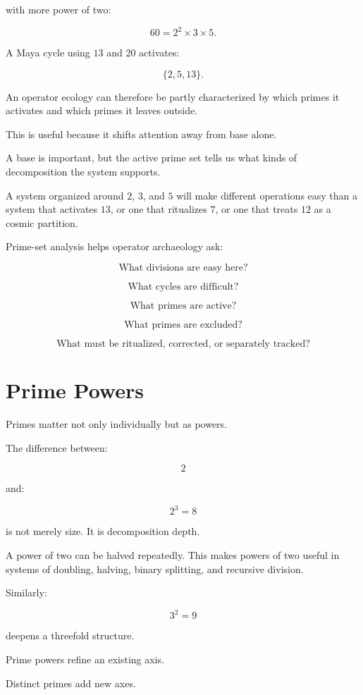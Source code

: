 \documentclass[11pt]{book}
\begin{document}
with more power of two:

\[
60 = 2^2 \times 3 \times 5.
\]

A Maya cycle using \(13\) and \(20\) activates:

\[
\{2,5,13\}.
\]

An operator ecology can therefore be partly characterized by which primes it activates and which primes it leaves outside.

This is useful because it shifts attention away from base alone.

A base is important, but the active prime set tells us what kinds of decomposition the system supports.

A system organized around \(2\), \(3\), and \(5\) will make different operations easy than a system that activates \(13\), or one that ritualizes \(7\), or one that treats \(12\) as a cosmic partition.

Prime-set analysis helps operator archaeology ask:

\[
\text{What divisions are easy here?}
\]

\[
\text{What cycles are difficult?}
\]

\[
\text{What primes are active?}
\]

\[
\text{What primes are excluded?}
\]

\[
\text{What must be ritualized, corrected, or separately tracked?}
\]

\section{Prime Powers}

Primes matter not only individually but as powers.

The difference between:

\[
2
\]

and:

\[
2^3 = 8
\]

is not merely size. It is decomposition depth.

A power of two can be halved repeatedly. This makes powers of two useful in systems of doubling, halving, binary splitting, and recursive division.

Similarly:

\[
3^2 = 9
\]

deepens a threefold structure.

Prime powers refine an existing axis.

Distinct primes add new axes.
\end{document}
